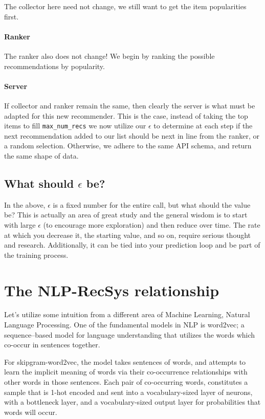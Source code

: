 The collector here need not change, we still want to get the item popularities first.

\paragraph{Ranker}

The ranker also does not change! We begin by ranking the possible recommendations by popularity.

\paragraph{Server}

If collector and ranker remain the same, then clearly the server is what must be adapted for this new recommender. This is the case, instead of taking the top items to fill \lstinline{max_num_recs} we now utilize our $\epsilon$ to determine at each step if the next recommendation added to our list should be next in line from the ranker, or a random selection. Otherwise, we adhere to the same API schema, and return the same shape of data.

\subsection{What should $\epsilon$ be?}

In the above, $\epsilon$ is a fixed number for the entire call, but what should the value be? This is actually an area of great study and the general wisdom is to start with large $\epsilon$ (to encourage more exploration) and then reduce over time. The rate at which you decrease it, the starting value, and so on, require serious thought and research. Additionally, it can be tied into your prediction loop and be part of the training process.

\section{The NLP-RecSys relationship}

Let's utilize some intuition from a different area of Machine Learning, Natural Language Processing. One of the fundamental models in NLP is word2vec; a sequence–based model for language understanding that utilizes the words which co-occur in sentences together. 

For skipgram-word2vec, the model takes sentences of words, and attempts to learn the implicit meaning of words via their co-occurrence relationships with other words in those sentences. Each pair of co-occurring words, constitutes a sample that is 1-hot encoded and sent into a vocabulary-sized layer of neurons, with a bottleneck layer, and a vocabulary-sized output layer for probabilities that words will occur.

